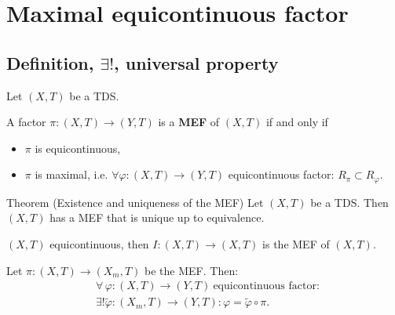 \section{Maximal equicontinuous factor}
\subsection{Definition, $\exists!$, universal property}
\begin{frame}
  Let $(X,T)$ be a TDS.
  \begin{definition}
    A factor $\pi : (X,T) \to (Y,T)$ is a \textbf{MEF} of $(X,T)$ if and only if
  \begin{itemize}
    \item $\pi$ is equicontinuous,
    \item $\pi$ is maximal, i.e. $\forall \varphi : (X,T) \to (Y,T)$ equicontinuous factor: $R_\pi \subset R_\varphi$.
  \end{itemize}
\end{definition}
\pause
  \begin{alertblock}{Theorem (Existence and uniqueness of the MEF)}
  Let $(X,T)$ be a TDS.
  Then $(X,T)$ has a MEF that is unique up to equivalence.
  \end{alertblock}
  \pause
\begin{example}
  $(X,T)$ equicontinuous, then $I: (X,T) \to (X,T)$ is the MEF of $(X,T)$.
\end{example}

\end{frame}
\begin{frame}[fragile]
\begin{proposition}
  Let $\pi : (X, T) \to  (X_m,T)$ be the MEF.
  Then:
  \begin{equation*}
    \begin{split}
      &\forall \, \varphi : (X,T) \to (Y,T) \ \text{equicontinuous factor}: \\
      & \exists!\tilde{\varphi}: (X_m,T) \to (Y,T): \varphi = \tilde{\varphi} \circ \pi.
    \end{split}
      \end{equation*}
  \end{proposition}
  \begin{center}
  \end{center}
\end{frame}
